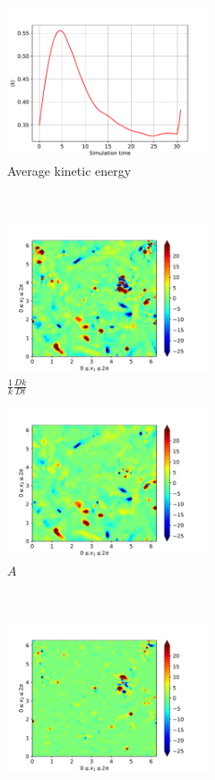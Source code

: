 \begin{figure}[H]
    \begin{subfigure}[H]{0.45\textwidth}
        \includegraphics[height=1.75in]{media/run-cds-65/ke-average1400}
        \caption{Average kinetic energy}
    \end{subfigure}
    ~
    \begin{subfigure}[H]{0.45\textwidth}
        \includegraphics[height=1.75in]{media/run-cds-65/ke-1400}
        \caption{$\frac{1}{k} \frac{D k}{Dt}$}
    \end{subfigure}
    \newline
    \begin{subfigure}{0.45\textwidth}
        \includegraphics[height=1.75in]{media/run-cds-65/A-ke-1400}
        \caption{$A$}
    \end{subfigure}
    ~
    \begin{subfigure}{0.45\textwidth}
        \includegraphics[height=1.75in]{media/run-cds-65/C-ke-1400}

\end{subfigure}
\end{figure}
